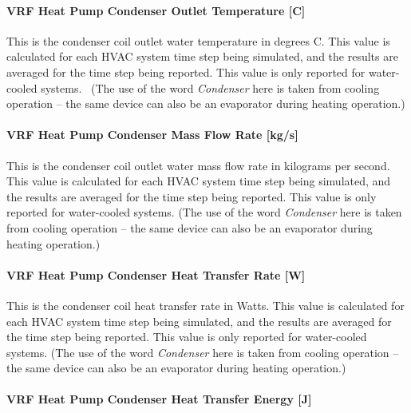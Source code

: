 \paragraph{VRF Heat Pump Condenser Outlet Temperature {[}C{]}}\label{vrf-heat-pump-condenser-outlet-temperature-c}

This is the condenser coil outlet water temperature in degrees C. This value is calculated for each HVAC system time step being simulated, and the results are averaged for the time step being reported. This value is only reported for water-cooled systems.~ (The use of the word \emph{Condenser} here is taken from cooling operation -- the same device can also be an evaporator during heating operation.)

\paragraph{VRF Heat Pump Condenser Mass Flow Rate {[}kg/s{]}}\label{vrf-heat-pump-condenser-mass-flow-rate-kgs}

This is the condenser coil outlet water mass flow rate in kilograms per second. This value is calculated for each HVAC system time step being simulated, and the results are averaged for the time step being reported. This value is only reported for water-cooled systems. (The use of the word \emph{Condenser} here is taken from cooling operation -- the same device can also be an evaporator during heating operation.)

\paragraph{VRF Heat Pump Condenser Heat Transfer Rate {[}W{]}}\label{vrf-heat-pump-condenser-heat-transfer-rate-w}

This is the condenser coil heat transfer rate in Watts. This value is calculated for each HVAC system time step being simulated, and the results are averaged for the time step being reported. This value is only reported for water-cooled systems. (The use of the word \emph{Condenser} here is taken from cooling operation -- the same device can also be an evaporator during heating operation.)

\paragraph{VRF Heat Pump Condenser Heat Transfer Energy {[}J{]}}\label{vrf-heat-pump-condenser-heat-transfer-energy-j}

